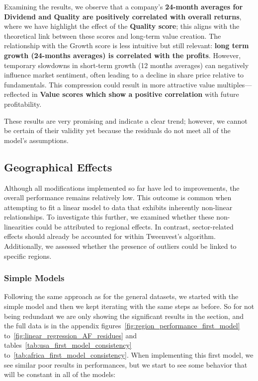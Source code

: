 \documentclass[11pt,english,a4paper,hidelinks]{book}
\begin{document}
\noindent Examining the results, we observe that a company's \textbf{24-month averages for Dividend and Quality are positively correlated with overall returns}, where we have highlight the effect of the \textbf{Quality score}; this aligns with the theoretical link between these scores and long-term value creation. The relationship with the Growth score is less intuitive but still relevant: \textbf{long term growth (24-months averages) is correlated with the profits}. However, temporary slowdowns in short-term growth (12 months averages) can negatively influence market sentiment, often leading to a decline in share price relative to fundamentals. This compression could result in more attractive value multiples—reflected in \textbf{Value scores which show a positive correlation} with future profitability.

\noindent These results are very promising and indicate a clear trend; however, we cannot be certain of their validity yet because the residuals do not meet all of the model's assumptions.

\subsection{Geographical Effects}

\noindent Although all modifications implemented so far have led to improvements, the overall performance remains relatively low. This outcome is common when attempting to fit a linear model to data that exhibits inherently non-linear relationships. To investigate this further, we examined whether these non-linearities could be attributed to regional effects. In contrast, sector-related effects should already be accounted for within Tweenvest’s algorithm. Additionally, we assessed whether the presence of outliers could be linked to specific regions.
\subsubsection{Simple Models}

\noindent Following the same approach as for the general datasets, we started with the simple model and then we kept iterating with the same steps as before. So for not being redundant we are only showing the significant results in the section, and the full data is in the appendix figures~\ref{fig:region_performance_first_model} to~\ref{fig:linear_regression_AF_residues} and tables~\ref{tab:usa_first_model_consistency} to~\ref{tab:africa_first_model_consistency}. When implementing this first model, we see similar poor results in performances, but we start to see some behavior that will be constant in all of the models:
\end{document}
